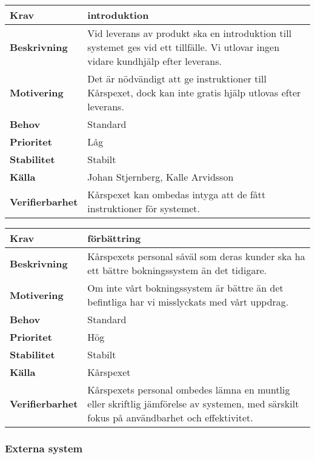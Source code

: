 \documentclass[a4paper, twoside, 11pt, titlepage]{article}
\begin{document}
		\begin{tabular} { p{2.6cm} p{12.5cm} }
			\hline
			\sffamily\textbf{Krav} & introduktion  \\
			\hline
			\sffamily\textbf{Beskrivning} & Vid leverans av produkt ska en introduktion till systemet ges vid ett tillfälle. Vi utlovar ingen vidare kundhjälp efter leverans.  \\
			\hline
			\sffamily\textbf{Motivering} & Det är nödvändigt att ge instruktioner till Kårspexet, dock kan inte gratis hjälp utlovas efter leverans.  \\
			\hline
			\sffamily\textbf{Behov} & Standard  \\
			\hline
			\sffamily\textbf{Prioritet} & Låg  \\
			\hline
			\sffamily\textbf{Stabilitet} & Stabilt  \\
			\hline
			\sffamily\textbf{Källa} & Johan Stjernberg, Kalle Arvidsson  \\
			\hline
			\sffamily\textbf{Verifierbarhet} & Kårspexet kan ombedas intyga att de fått instruktioner för systemet.  \\
			\hline
		\end{tabular}
		\vspace{6mm}

		\begin{tabular} { p{2.6cm} p{12.5cm} }
			\hline
			\sffamily\textbf{Krav} & förbättring  \\
			\hline
			\sffamily\textbf{Beskrivning} & Kårspexets personal såväl som deras kunder ska ha ett bättre bokningssystem än det tidigare.  \\
			\hline
			\sffamily\textbf{Motivering} & Om inte vårt bokningssystem är bättre än det befintliga har vi misslyckats med vårt uppdrag.  \\
			\hline
			\sffamily\textbf{Behov} & Standard  \\
			\hline
			\sffamily\textbf{Prioritet} & Hög  \\
			\hline
			\sffamily\textbf{Stabilitet} & Stabilt  \\
			\hline
			\sffamily\textbf{Källa} & Kårspexet  \\
			\hline
			\sffamily\textbf{Verifierbarhet} & Kårspexets personal ombedes lämna en muntlig eller skriftlig jämförelse av systemen, med särskilt fokus på användbarhet och effektivitet.  \\
			\hline
		\end{tabular}


		\subsubsection{Externa system}
\end{document}
